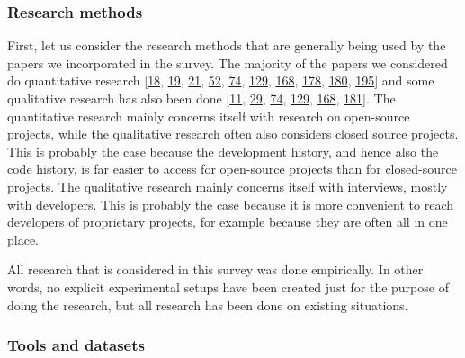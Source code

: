 \documentclass[]{book}
\begin{document}
\subsubsection{Research methods}\label{research-methods}

First, let us consider the research methods that are generally being
used by the papers we incorporated in the survey. The majority of the
papers we considered do quantitative research
{[}\protect\hyperlink{ref-baysal2016investigating}{18},
\protect\hyperlink{ref-baysal2013influence}{19},
\protect\hyperlink{ref-beller2014modern}{21},
\protect\hyperlink{ref-czerwonka2015code}{52},
\protect\hyperlink{ref-gousios2014exploratory}{74},
\protect\hyperlink{ref-mcintosh2014impact}{129},
\protect\hyperlink{ref-shimagaki2016study}{168},
\protect\hyperlink{ref-thongtanunam2017review}{178},
\protect\hyperlink{ref-thongtanunam2015should}{180},
\protect\hyperlink{ref-zanjani2016automatically}{195}{]} and some
qualitative research has also been done
{[}\protect\hyperlink{ref-bacchelli2013expectations}{11},
\protect\hyperlink{ref-bird2015lessons}{29},
\protect\hyperlink{ref-gousios2014exploratory}{74},
\protect\hyperlink{ref-mcintosh2014impact}{129},
\protect\hyperlink{ref-shimagaki2016study}{168},
\protect\hyperlink{ref-thongtanunam2014reda}{181}{]}. The quantitative
research mainly concerns itself with research on open-source projects,
while the qualitative research often also considers closed source
projects. This is probably the case because the development history, and
hence also the code history, is far easier to access for open-source
projects than for closed-source projects. The qualitative research
mainly concerns itself with interviews, mostly with developers. This is
probably the case because it is more convenient to reach developers of
proprietary projects, for example because they are often all in one
place.

All research that is considered in this survey was done empirically. In
other words, no explicit experimental setups have been created just for
the purpose of doing the research, but all research has been done on
existing situations.

\subsubsection{Tools and datasets}\label{tools-and-datasets}
\end{document}

